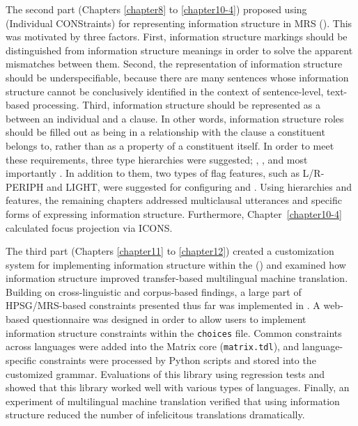 The second part (Chapters \ref{chapter8} to \ref{chapter10-4})
proposed using  (Individual CONStraints) for representing information structure in MRS
(\citealt{copestake:etal:05}). This was motivated by three
factors.  First, information structure markings should be
distinguished from information structure meanings in order to solve
the apparent mismatches between them. Second, the representation of
information structure should be
underspecifiable, because there are many
sentences whose information structure cannot be conclusively
identified in the context of sentence-level, text-based
processing. Third, information structure should be represented as a
 between an individual and a clause. In other
words, information structure roles should be filled out as being in a
relationship with the clause a constituent belongs to, rather than as
a property of a constituent itself. In order to meet these
requirements, three type hierarchies were suggested; ,
, and most importantly
.
In addition to them, two types of flag features, such as L/R-PERIPH
and LIGHT, were suggested for configuring 
and . Using hierarchies and
features, the remaining chapters addressed multiclausal utterances and
specific forms of expressing information structure. Furthermore,
Chapter~\ref{chapter10-4} calculated focus projection via
ICONS.


The third part (Chapters \ref{chapter11} to \ref{chapter12}) created a
customization system for implementing information structure within the
\lingo {} (\citealt{bender:etal:10}) and examined
how information structure improved transfer-based multilingual machine
translation. Building on cross-linguistic and
corpus-based findings, a large part of HPSG/MRS-based
constraints presented thus far was implemented in . A
web-based questionnaire was designed in order to allow users to
implement information structure constraints within the
\texttt{choices} file. Common constraints across languages were added
into the Matrix core (\texttt{matrix.tdl}), and language-specific
constraints were processed by Python scripts and stored into the
customized grammar. Evaluations of this library using regression tests
and  \citep{bender:14} showed that this library
worked well with various types of languages.
Finally, an experiment of multilingual machine translation verified
that using information structure reduced the number of infelicitous
translations dramatically.





